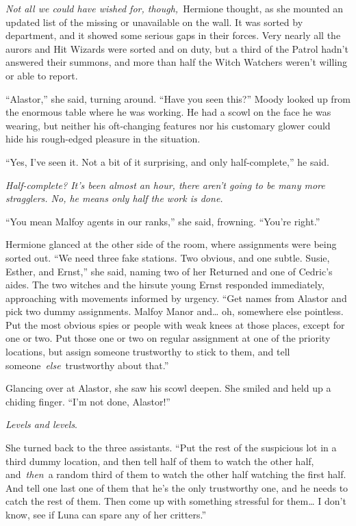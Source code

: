 \emph{Not all we could have wished for, though,}~Hermione thought, as
she mounted an updated list of the missing or unavailable on the wall.
It was sorted by department, and it showed some serious gaps in their
forces. Very nearly all the aurors and Hit Wizards were sorted and on
duty, but a third of the Patrol hadn't answered their summons, and more
than half the Witch Watchers weren't willing or able to report.

``Alastor,'' she said, turning around. ``Have you seen this?'' Moody
looked up from the enormous table where he was working. He had a scowl
on the face he was wearing, but neither his oft-changing features nor
his customary glower could hide his rough-edged pleasure in the
situation.

``Yes, I've seen it. Not a bit of it surprising, and only
half-complete,'' he said.

\emph{Half-complete? It's been almost an hour, there aren't going to be
many more stragglers. No, he means only half the work is done.}

``You mean Malfoy agents in our ranks,'' she said, frowning. ``You're
right.''

Hermione glanced at the other side of the room, where assignments were
being sorted out. ``We need three fake stations. Two obvious, and one
subtle. Susie, Esther, and Ernst,'' she said, naming two of her Returned
and one of Cedric's aides. The two witches and the hirsute young Ernst
responded immediately, approaching with movements informed by urgency.
``Get names from Alastor and pick two dummy assignments. Malfoy Manor
and\ldots{} oh, somewhere else pointless. Put the most obvious spies or
people with weak knees at those places, except for one or two. Put those
one or two on regular assignment at one of the priority locations, but
assign someone trustworthy to stick to them, and tell
someone~\emph{else}~trustworthy about that.''

Glancing over at Alastor, she saw his scowl deepen. She smiled and held
up a chiding finger. ``I'm not done, Alastor!''

\emph{Levels and levels}.

She turned back to the three assistants. ``Put the rest of the
suspicious lot in a third dummy location, and then tell half of them to
watch the other half, and~\emph{then}~a random third of them to watch
the other half watching the first half. And tell one last one of them
that he's the only trustworthy one, and he needs to catch the rest of
them. Then come up with something stressful for them\ldots{} I don't
know, see if Luna can spare any of her critters.''

